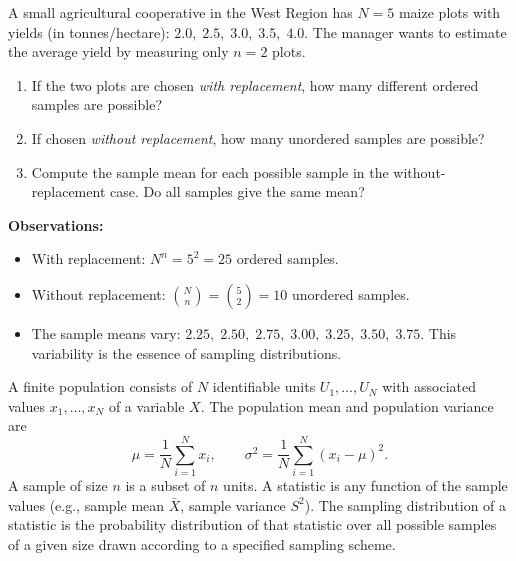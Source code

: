 \documentclass[11pt]{article}
\newcommand{\cle}[1]{{\popxbold\color{popdark}#1}}
\begin{document}
\begin{experience}
A small agricultural cooperative in the West Region has $N=5$ maize plots with yields (in tonnes/hectare): $2.0,\; 2.5,\; 3.0,\; 3.5,\; 4.0$. The manager wants to estimate the average yield by measuring only $n=2$ plots. 
\begin{enumerate}
\item If the two plots are chosen \emph{with replacement}, how many different ordered samples are possible? 
\item If chosen \emph{without replacement}, how many unordered samples are possible?
\item Compute the sample mean for each possible sample in the without-replacement case. Do all samples give the same mean?
\end{enumerate}
\tcblower
\textbf{Observations:}
\begin{itemize}
\item With replacement: $N^n = 5^2 = 25$ ordered samples.
\item Without replacement: $\binom{N}{n} = \binom{5}{2} = 10$ unordered samples.
\item The sample means vary: $2.25,\; 2.50,\; 2.75,\; 3.00,\; 3.25,\; 3.50,\; 3.75$. This variability is the essence of \cle{sampling distributions}.
\end{itemize}
\end{experience}

\begin{definition}
A \cle{finite population} consists of $N$ identifiable units $U_1,\dots,U_N$ with associated values $x_1,\dots,x_N$ of a variable $X$. The \cle{population mean} and \cle{population variance} are
\[
\mu = \frac{1}{N}\sum_{i=1}^N x_i,\qquad 
\sigma^2 = \frac{1}{N}\sum_{i=1}^N (x_i-\mu)^2.
\]
A \cle{sample} of size $n$ is a subset of $n$ units. A \cle{statistic} is any function of the sample values (e.g., sample mean $\bar{X}$, sample variance $S^2$). The \cle{sampling distribution} of a statistic is the probability distribution of that statistic over all possible samples of a given size drawn according to a specified sampling scheme.
\end{definition}
\end{document}
